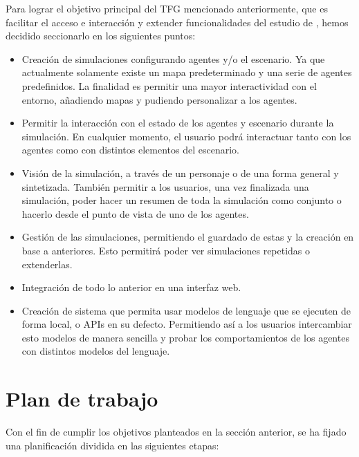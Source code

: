 Para lograr el objetivo principal del TFG mencionado anteriormente, que es facilitar el acceso e interacción y extender funcionalidades del estudio de  \ga, hemos decidido seccionarlo en los siguientes puntos:
\begin{itemize}
\item Creación de simulaciones configurando agentes y/o el escenario. Ya que actualmente solamente existe un mapa predeterminado y una serie de agentes predefinidos. La finalidad es permitir una mayor interactividad con el entorno, añadiendo mapas y pudiendo personalizar a los agentes.

\item Permitir la interacción con el estado de los agentes y escenario durante la simulación. En cualquier momento, el usuario podrá interactuar tanto con los agentes como con distintos elementos del escenario.

\item Visión de la simulación, a través de un personaje o de una forma general y sintetizada. También permitir a los usuarios, una vez finalizada una simulación, poder hacer un resumen de toda la simulación como conjunto o hacerlo desde el punto de vista de uno de los agentes.

\item Gestión de las simulaciones, permitiendo el guardado de estas y la creación en base a anteriores. Esto permitirá poder ver simulaciones repetidas o extenderlas.

\item Integración de todo lo anterior en una interfaz web.

\item Creación de sistema que permita usar modelos de lenguaje que se ejecuten de forma local, o APIs en su defecto. Permitiendo así a los usuarios intercambiar esto modelos de manera sencilla y probar los comportamientos de los agentes con distintos modelos del lenguaje.
\end{itemize}


\section{Plan de trabajo}
Con el fin de cumplir los objetivos planteados en la sección anterior, se ha fijado una planificación dividida en las siguientes etapas:

